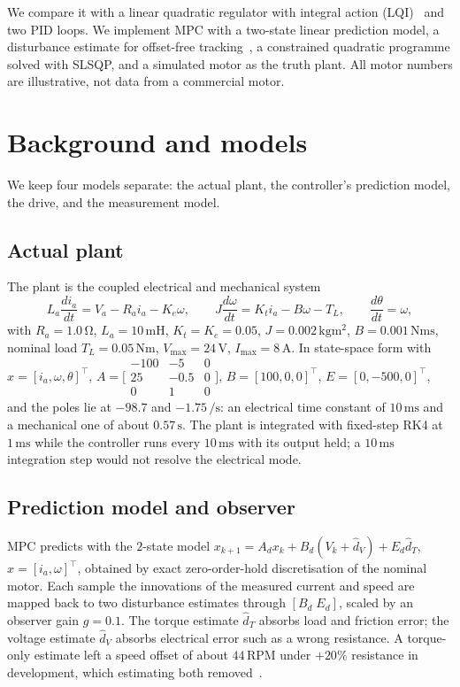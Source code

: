 \documentclass[11pt,a4paper]{article}
\begin{document}
We compare it with a linear quadratic regulator with integral action (LQI)~\cite{anderson1990} and two PID loops.
We implement MPC with a two-state linear prediction model, a disturbance estimate for offset-free tracking~\cite{pannocchia2003}, a constrained quadratic programme solved with SLSQP, and a simulated motor as the truth plant.
All motor numbers are illustrative, not data from a commercial motor.

\section{Background and models}
We keep four models separate: the actual plant, the controller's prediction model, the drive, and the measurement model.

\subsection{Actual plant}
The plant is the coupled electrical and mechanical system
\begin{equation}
  L_a \frac{di_a}{dt} = V_a - R_a i_a - K_e\omega,\qquad
  J\frac{d\omega}{dt} = K_t i_a - B\omega - T_L,\qquad
  \frac{d\theta}{dt}=\omega,
  \label{eq:motor}
\end{equation}
with \(R_a{=}1.0\,\si{\ohm}\), \(L_a{=}10\,\si{\milli\henry}\), \(K_t{=}K_e{=}0.05\), \(J{=}0.002\,\si{\kilogram\meter\squared}\), \(B{=}0.001\,\si{\newton\meter\second}\), nominal load \(T_L{=}0.05\,\si{\newton\meter}\), \(V_{\max}{=}24\,\si{\volt}\), \(I_{\max}{=}8\,\si{\ampere}\).
In state-space form with \(x=[i_a,\omega,\theta]^\top\), \(A=\bigl[\begin{smallmatrix}-100&-5&0\\25&-0.5&0\\0&1&0\end{smallmatrix}\bigr]\), \(B=[100,0,0]^\top\), \(E=[0,-500,0]^\top\), and the poles lie at \(-98.7\) and \(-1.75\,\si{\per\second}\): an electrical time constant of \(10\,\si{\milli\second}\) and a mechanical one of about \(0.57\,\si{\second}\).
The plant is integrated with fixed-step RK4 at \(1\,\si{\milli\second}\) while the controller runs every \(10\,\si{\milli\second}\) with its output held; a \(10\,\si{\milli\second}\) integration step would not resolve the electrical mode.

\subsection{Prediction model and observer}
MPC predicts with the \(2\)-state model \(x_{k+1}=A_dx_k+B_d(V_k+\hat d_V)+E_d\hat d_T\), \(x=[i_a,\omega]^\top\), obtained by exact zero-order-hold discretisation of the nominal motor.
Each sample the innovations of the measured current and speed are mapped back to two disturbance estimates through \([B_d\;E_d]\), scaled by an observer gain \(g{=}0.1\).
The torque estimate \(\hat d_T\) absorbs load and friction error; the voltage estimate \(\hat d_V\) absorbs electrical error such as a wrong resistance.
A torque-only estimate left a speed offset of about \(44\,\mathrm{RPM}\) under \(+20\%\) resistance in development, which estimating both removed~\cite{pannocchia2003}.
\end{document}
